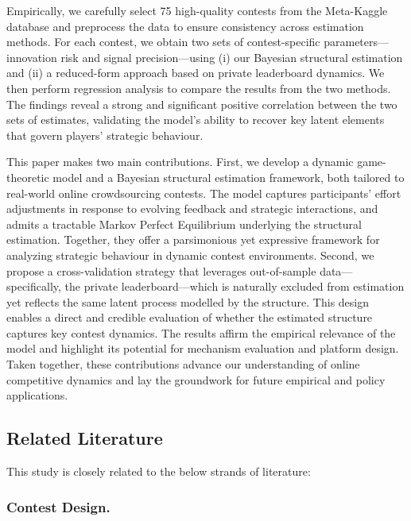\documentclass[mnsc]{informs3}
\begin{document}
Empirically, we carefully select 75 high-quality contests from the Meta-Kaggle database and preprocess the data to ensure consistency across estimation methods.
For each contest, we obtain two sets of contest-specific parameters—innovation risk and signal precision—using (i) our Bayesian structural estimation and (ii) a reduced-form approach based on private leaderboard dynamics.
We then perform regression analysis to compare the results from the two methods.
The findings reveal a strong and significant positive correlation between the two sets of estimates, validating the model’s ability to recover key latent elements that govern players’ strategic behaviour.


This paper makes two main contributions.
First, we develop a dynamic game-theoretic model and a Bayesian structural estimation framework, both tailored to real-world online crowdsourcing contests.
The model captures participants’ effort adjustments in response to evolving feedback and strategic interactions, and admits a tractable Markov Perfect Equilibrium underlying the structural estimation.
Together, they offer a parsimonious yet expressive framework for analyzing strategic behaviour in dynamic contest environments.
Second, we propose a cross-validation strategy that leverages out-of-sample data—specifically, the private leaderboard—which is naturally excluded from estimation yet reflects the same latent process modelled by the structure.
This design enables a direct and credible evaluation of whether the estimated structure captures key contest dynamics.
The results affirm the empirical relevance of the model and highlight its potential for mechanism evaluation and platform design.
Taken together, these contributions advance our understanding of online competitive dynamics and lay the groundwork for future empirical and policy applications.



\subsection{Related Literature}

This study is closely related to the below strands of literature:

\subsubsection{Contest Design.}
\end{document}
